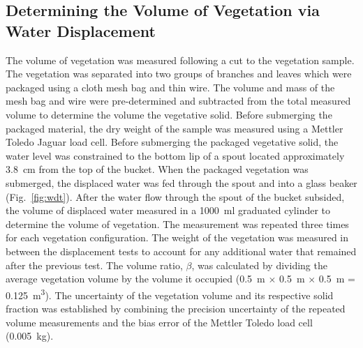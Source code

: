 \documentclass[12pt]{article}
\begin{document}
\subsection{Determining the Volume of Vegetation via Water Displacement}
\label{ssec:headingscap}

The volume of vegetation was measured following a cut to the vegetation sample. The vegetation was separated into two groups of branches and leaves which were packaged using a cloth mesh bag and thin wire. The volume and mass of the mesh bag and wire were pre-determined and subtracted from the total measured volume to determine the volume the vegetative solid. Before submerging the packaged material, the dry weight of the sample was measured using a Mettler Toledo Jaguar load cell. Before submerging the packaged vegetative solid, the water level was constrained to the bottom lip of a spout located approximately 3.8~\si{cm} from the top of the bucket. When the packaged vegetation was submerged, the displaced water was fed through the spout and into a glass beaker (Fig.~\ref{fig:wdt}). After the water flow through the spout of the bucket subsided, the volume of displaced water measured in a 1000~ml graduated cylinder to determine the volume of vegetation. The measurement was repeated three times for each vegetation configuration. The weight of the vegetation was measured in between the displacement tests to account for any additional water that remained after the previous test. The volume ratio, $\beta$, was calculated by dividing the average vegetation volume by the volume it occupied (0.5~\si{m} $\times$ 0.5~\si{m} $\times$ 0.5~\si{m} = 0.125~\si{m^{3}}). The uncertainty of the vegetation volume and its respective solid fraction was established by combining the precision uncertainty of the repeated volume measurements and the bias error of the Mettler Toledo load cell (0.005~\si{kg}).
\end{document}
